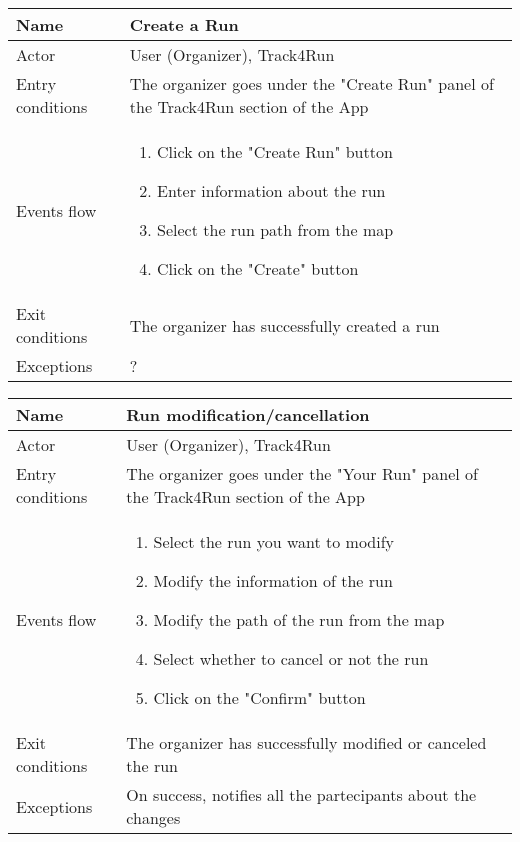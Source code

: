 \begin{table}[]
\begin{tabular}{|l|p{12cm}|}
\hline
Name             & Create a Run \\ \hline
Actor            & User (Organizer), Track4Run \\ \hline
Entry conditions & The organizer goes under the "Create Run" panel of the Track4Run section of the App \\ \hline
Events flow      & \begin{enumerate}
\item Click on the "Create Run" button
\item Enter information about the run
\item Select the run path from the map
\item Click on the "Create" button
\end{enumerate} \\ \hline
Exit conditions  & The organizer has successfully created a run \\ \hline
Exceptions       & ?\\ \hline
\end{tabular}
\end{table}

\begin{table}[]
\begin{tabular}{|l|p{12cm}|}
\hline
Name             & Run modification/cancellation \\ \hline
Actor            & User (Organizer), Track4Run \\ \hline
Entry conditions & The organizer goes under the "Your Run" panel of the Track4Run section of the App \\ \hline
Events flow      & \begin{enumerate}
\item Select the run you want to modify
\item Modify the information of the run
\item Modify the path of the run from the map
\item Select whether to cancel or not the run
\item Click on the "Confirm" button
\end{enumerate} \\ \hline
Exit conditions  & The organizer has successfully modified or canceled the run \\ \hline
Exceptions       & On success, notifies all the partecipants about the changes\\ \hline
\end{tabular}
\end{table}

